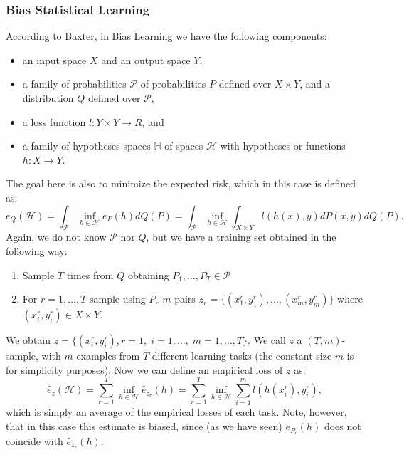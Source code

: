 \subsubsection*{Bias Statistical Learning}
According to Baxter, in Bias Learning we have the following components:
\begin{itemize}\label{eq:biaslearn_exprisk}
    \item an input space $X$ and an output space $Y$,
    \item a family of probabilities $\mathcal{P}$ of probabilities $P$ defined over $X \times Y$, and a distribution $Q$ defined over $\mathcal{P}$,
    \item a loss function $l:Y \times Y \to R$, and
    \item a family of hypotheses spaces $\mathbb{H}$ of spaces $\mathcal{H}$ with hypotheses or functions $h: X \to Y$.
\end{itemize}
The goal here is also to minimize the expected risk, which in this case is defined as:
\begin{equation}\label{}
    e_Q(\mathcal{H}) = \int_{\mathcal{P}} \inf_{h \in \mathcal{H}} e_P(h) dQ(P) = \int_{\mathcal{P}} \inf_{h \in \mathcal{H}} \int_{X \times Y} l(h(x), y) dP(x, y) dQ(P).
\end{equation}
Again, we do not know $\mathcal{P}$ nor $Q$, but we have a training set obtained in the following way:
\begin{enumerate}
    \item Sample $T$ times from $Q$ obtaining $P_1, \ldots, P_T \in \mathcal{P}$
    \item For $r=1, \ldots, T$ sample using $P_r$ $m$ pairs $z_r = \{(x_1^r, y_1^r), \ldots, (x_m^r, y_m^r)\}$ where $(x_i^r, y_i^r) \in X \times Y$.
\end{enumerate}
We obtain $z=\{(x_i^r, y_i^r), r=1,\; i=1, \ldots, \;m=1, \ldots, T\}$.
We call $z$ a $(T, m)$-sample, with $m$ examples from $T$ different learning tasks (the constant size $m$ is for simplicity purposes).
Now we can define an empirical loss of $z$ as:
\begin{equation}\label{eq:biaslearn_emprisk}
    \hat{e}_z(\mathcal{H}) = \sum_{r=1}^T \inf_{h \in \mathcal{H}} \hat{e}_{z_r}(h) = \sum_{r=1}^T \inf_{h \in \mathcal{H}} \sum_{i=1}^m l(h(x_i^r), y_i^r),
\end{equation}
which is simply an average of the empirical losses of each task. Note, however, that in this case this estimate is biased, since (as we have seen) $e_{P_r}(h)$ does not coincide with $\hat{e}_{z_r}(h)$. 
